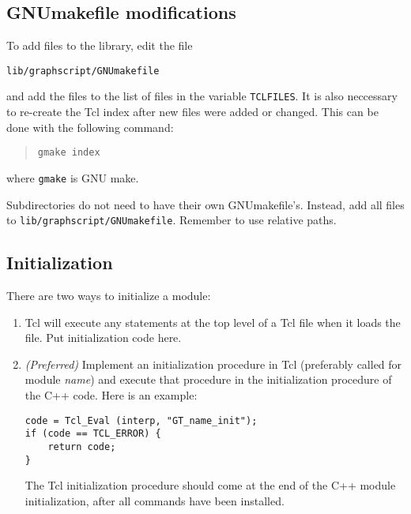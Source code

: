 \documentclass[twoside,fleqn]{report}
\begin{document}
\subsection{GNUmakefile modifications}

To add files to the \GraphScript{} library, edit the file

\begin{alltt} 
  lib/graphscript/GNUmakefile
\end{alltt}

\noindent and add the files to the list of files in the variable 
\texttt{TCLFILES}.  It is also neccessary to re-create the Tcl index 
after new files were added or changed.  This can be done with the 
following command:

\begin{quote}
  \texttt{gmake index}
\end{quote}

\noindent where \texttt{gmake} is GNU make.

\begin{notes}
  \item
  Subdirectories do not need to have their own GNUmakefile's.  
  Instead, add all files to \texttt{lib/graphscript/GNUmakefile}.  
  Remember to use relative paths.
\end{notes}


\subsection{Initialization}

There are two ways to initialize a \GraphScript{} module:

\begin{enumerate}
  \item 
  Tcl will execute any statements at the top level of a
  Tcl file when it loads the file. Put initialization code
  here.
  
  \item 
  \emph{(Preferred)}
  Implement an initialization procedure in Tcl (preferably called 
   for module \emph{name}) and execute that 
  procedure in the initialization procedure of the C++ code.  
  Here is an example:
  
\begin{verbatim}
code = Tcl_Eval (interp, "GT_name_init");
if (code == TCL_ERROR) {
    return code;
}
\end{verbatim}

  The Tcl initialization procedure should come at the end of the
  C++ module initialization, after all \GraphScript{} commands have
  been installed.

\end{enumerate}
\end{document}
